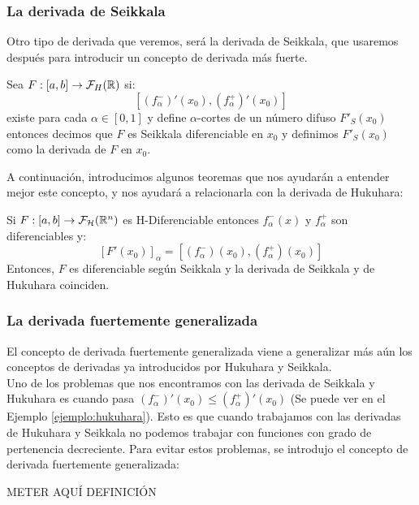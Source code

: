 \subsubsection{La derivada de Seikkala}
Otro tipo de derivada que veremos, será la derivada de Seikkala, que usaremos después para introducir un concepto de derivada más fuerte.

\begin{definicion}
	Sea $F: [a, b] \rightarrow \mathcal{F}_H(\mathbb R)$ si:
	\[
		[(f^-_\alpha)'(x_0), (f^+_\alpha)'(x_0)]
	\]
	existe para cada $\alpha \in [0, 1]$ y define $\alpha$-cortes de un número difuso $F'_S(x_0)$ entonces decimos que $F$ es Seikkala diferenciable en $x_0$ y definimos $F'_S(x_0)$ como la derivada de $F$ en $x_0$.
\end{definicion}

A continuación, introducimos algunos teoremas que nos ayudarán a entender mejor este concepto, y nos ayudará a relacionarla con la derivada de Hukuhara:

\begin{teorema}
	Si $F: [a, b] \rightarrow \mathcal{F}_\mathcal{H}(\mathbb R^n)$ es H-Diferenciable entonces $f_\alpha^-(x)$ y $f_\alpha^+$ son diferenciables y:
	\[
		[F'(x_0)]_\alpha = [(f_\alpha^-)(x_0), (f_\alpha^+)(x_0)]
	\]
	Entonces, $F$ es diferenciable según Seikkala y la derivada de Seikkala y de Hukuhara coinciden.
\end{teorema}

\subsubsection{La derivada fuertemente generalizada}
El concepto de derivada fuertemente generalizada viene a generalizar más aún los conceptos de derivadas ya introducidos por Hukuhara y Seikkala. \\
Uno de los problemas que nos encontramos con las derivada de Seikkala y Hukuhara es cuando pasa $(f^-_\alpha)'(x_0) \leq (f^+_\alpha)'(x_0)$ (Se puede ver en el Ejemplo \ref{ejemplo:hukuhara}). Esto es que cuando trabajamos con las derivadas de Hukuhara y Seikkala no podemos trabajar con funciones con grado de pertenencia decreciente. Para evitar estos problemas, se introdujo el concepto de derivada fuertemente generalizada:

\begin{definicion}
	METER AQUÍ DEFINICIÓN
\end{definicion}